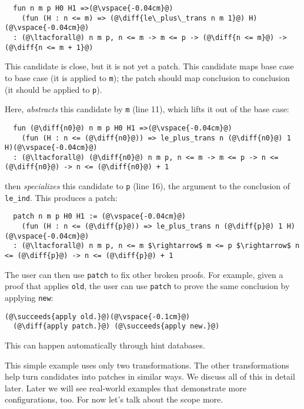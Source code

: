 \begin{lstlisting}
  fun n m p H0 H1 =>(@\vspace{-0.04cm}@)
    (fun (H : n <= m) => (@\diff{le\_plus\_trans n m 1}@) H)(@\vspace{-0.04cm}@)
  : (@\ltacforall@) n m p, n <= m -> m <= p -> (@\diff{n <= m}@) -> (@\diff{n <= m + 1}@)
\end{lstlisting}

This candidate is close, but it is not yet a patch. This candidate
maps base case to base case (it is applied to \lstinline{m}); the patch should map conclusion to conclusion (it should
be applied to \lstinline{p}).

Here, \sysname \textit{abstracts} this candidate by \lstinline{m} (line 11), which lifts it out of the base case:

\begin{lstlisting}
  fun (@\diff{n0}@) n m p H0 H1 =>(@\vspace{-0.04cm}@)
    (fun (H : n <= (@\diff{n0}@)) => le_plus_trans n (@\diff{n0}@) 1 H)(@\vspace{-0.04cm}@)
  : (@\ltacforall@) (@\diff{n0}@) n m p, n <= m -> m <= p -> n <= (@\diff{n0}@) -> n <= (@\diff{n0}@) + 1
\end{lstlisting}
\sysname then \textit{specializes} this candidate to \lstinline{p} (line 16), the argument
to the conclusion of \lstinline{le_ind}. This produces a patch:

\begin{lstlisting}
  patch n m p H0 H1 := (@\vspace{-0.04cm}@)
    (fun (H : n <= (@\diff{p}@)) => le_plus_trans n (@\diff{p}@) 1 H)(@\vspace{-0.04cm}@)
  : (@\ltacforall@) n m p, n <= m $\rightarrow$ m <= p $\rightarrow$ n <= (@\diff{p}@) -> n <= (@\diff{p}@) + 1
\end{lstlisting}
The user can then use \lstinline{patch} to fix other broken proofs.
For example, given a proof that applies \lstinline{old}, the user can use \lstinline{patch} to prove the same conclusion
by applying \lstinline{new}:

\begin{lstlisting}[language=coq]
  (@\succeeds{apply old.}@)(@\vspace{-0.1cm}@)
  (@\diff{apply patch.}@) (@\succeeds{apply new.}@)
\end{lstlisting}
This can happen automatically through hint databases.

This simple example uses only two transformations. The other transformations help turn candidates
into patches in similar ways. We discuss all of this in detail later.
Later we will see real-world examples that demonstrate more configurations, too.
For now let's talk about the scope more.

